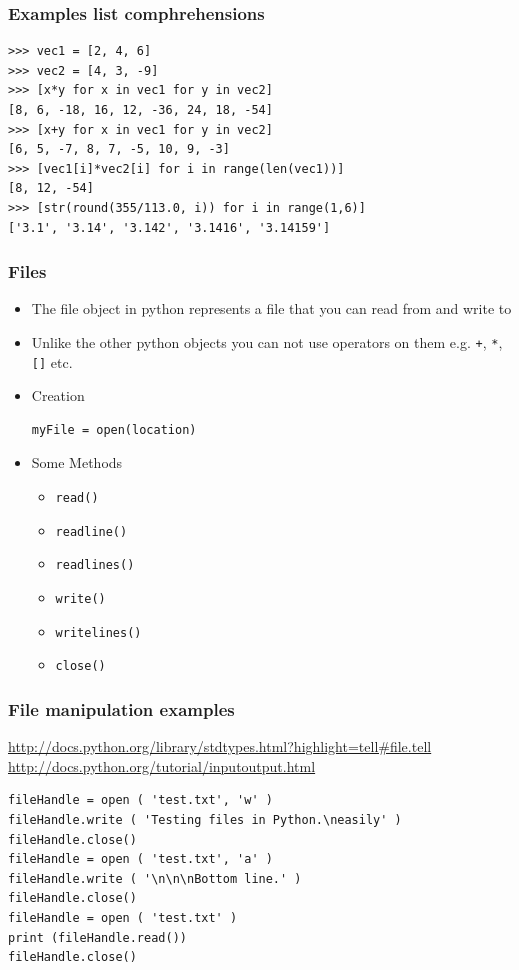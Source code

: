 \documentclass{beamer}
\begin{document}
\begin{frame}[containsverbatim]
\frametitle{Examples list comphrehensions}
\begin{lstlisting}
>>> vec1 = [2, 4, 6]
>>> vec2 = [4, 3, -9]
>>> [x*y for x in vec1 for y in vec2]
[8, 6, -18, 16, 12, -36, 24, 18, -54]
>>> [x+y for x in vec1 for y in vec2]
[6, 5, -7, 8, 7, -5, 10, 9, -3]
>>> [vec1[i]*vec2[i] for i in range(len(vec1))]
[8, 12, -54]
>>> [str(round(355/113.0, i)) for i in range(1,6)]
['3.1', '3.14', '3.142', '3.1416', '3.14159']
\end{lstlisting}
\end{frame}

\begin{frame}[containsverbatim]
\frametitle{Files}
\begin{itemize}
\item The file object in python represents a file that you can read from and write to
\item Unlike the other python objects you can not use operators on them e.g. \texttt{+}, \texttt{*}, \texttt{[]} etc.
\item Creation
\begin{lstlisting}
myFile = open(location)
\end{lstlisting}
\item Some Methods
\begin{itemize}
\item \texttt{read()}
\item \texttt{readline()}
\item \texttt{readlines()}
\item \texttt{write()}
\item \texttt{writelines()}
\item \texttt{close()}
\end{itemize}
\end{itemize}
\end{frame}

\begin{frame}[containsverbatim]
\frametitle{File manipulation examples}
\url{http://docs.python.org/library/stdtypes.html?highlight=tell#file.tell}
\url{http://docs.python.org/tutorial/inputoutput.html}
\begin{lstlisting}
fileHandle = open ( 'test.txt', 'w' )
fileHandle.write ( 'Testing files in Python.\neasily' )
fileHandle.close()
fileHandle = open ( 'test.txt', 'a' )
fileHandle.write ( '\n\n\nBottom line.' )
fileHandle.close()
fileHandle = open ( 'test.txt' )
print (fileHandle.read())
fileHandle.close()
\end{lstlisting}
\end{frame}
\end{document}
